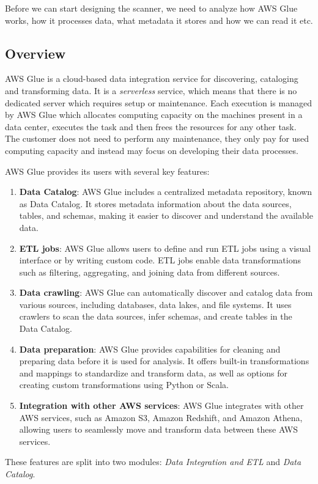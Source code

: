 Before we can start designing the scanner, we need to analyze how AWS Glue works, how it processes data, what metadata it stores and how we can read it etc. 

\subsection{Overview}

AWS Glue is a cloud-based data integration service for discovering, cataloging and transforming data. It is a \textit{serverless} service, which means that there is no dedicated server which requires setup or maintenance. Each execution is managed by AWS Glue which allocates computing capacity on the machines present in a data center, executes the task and then frees the resources for any other task. The customer does not need to perform any maintenance, they only pay for used computing capacity and instead may focus on developing their data processes.
\par
AWS Glue provides its users with several key features:
\begin{enumerate}
    \item \textbf{Data Catalog}: AWS Glue includes a centralized metadata repository, known as Data Catalog. It stores metadata information about the data sources, tables, and schemas, making it easier to discover and understand the available data.
    \item \textbf{ETL jobs}: AWS Glue allows users to define and run ETL jobs using a visual interface or by writing custom code. ETL jobs enable data transformations such as filtering, aggregating, and joining data from different sources.
    \item \textbf{Data crawling}: AWS Glue can automatically discover and catalog data from various sources, including databases, data lakes, and file systems. It uses crawlers to scan the data sources, infer schemas, and create tables in the Data Catalog.
    \item \textbf{Data preparation}: AWS Glue provides capabilities for cleaning and preparing data before it is used for analysis. It offers built-in transformations and mappings to standardize and transform data, as well as options for creating custom transformations using Python or Scala.
    \item \textbf{Integration with other AWS services}: AWS Glue integrates with other AWS services, such as Amazon S3, Amazon Redshift, and Amazon Athena, allowing users to seamlessly move and transform data between these AWS services.
\end{enumerate}
\par
These features are split into two modules: \textit{Data Integration and ETL} and \textit{Data Catalog}.

